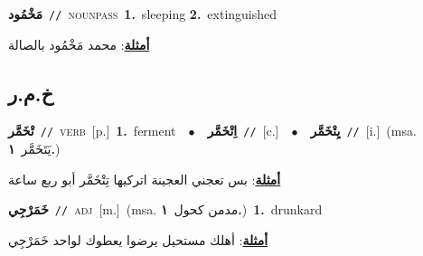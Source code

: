 \documentclass[10pt,a4paper,twoside]{article} %
\begin{document}
\begin{multicols}{2}
{\setlength\topsep{0pt}\textbf{\foreignlanguage{arabic}{مَخْمُود}}\ {\color{gray}\texttt{//}\color{black}}\ \textsc{noun\textunderscore pass}\ \textbf{1.}~sleeping  \textbf{2.}~extinguished\  \begin{flushright}\color{gray}\foreignlanguage{arabic}{\textbf{\underline{\foreignlanguage{arabic}{أمثلة}}}: محمد مَخْمُود بالصالة}\end{flushright}\color{black}} \vspace{2mm}

\vspace{-3mm}
\subsection*{\color{blue}\foreignlanguage{arabic}{خ.م.ر}\color{blue}{}} 

{\setlength\topsep{0pt}\textbf{\foreignlanguage{arabic}{تْخَمَّر}}\ {\color{gray}\texttt{//}\color{black}}\ \textsc{verb}\ [p.]\ \textbf{1.}~ferment\ \ $\bullet$\ \ \setlength\topsep{0pt}\textbf{\foreignlanguage{arabic}{اِتْخَمَّر}}\ {\color{gray}\texttt{//}\color{black}}\ [c.]\ \ $\bullet$\ \ \setlength\topsep{0pt}\textbf{\foreignlanguage{arabic}{يِتْخَمَّر}}\ {\color{gray}\texttt{//}\color{black}}\ [i.]\ \color{gray}(msa. \foreignlanguage{arabic}{يَتَخَمَّر}~\foreignlanguage{arabic}{\textbf{١.}})\color{black}\  \begin{flushright}\color{gray}\foreignlanguage{arabic}{\textbf{\underline{\foreignlanguage{arabic}{أمثلة}}}: بس تعجني العجينة اتركيها تِتْخَمَّر أبو ربع ساعة}\end{flushright}\color{black}} \vspace{2mm}

{\setlength\topsep{0pt}\textbf{\foreignlanguage{arabic}{خَمَرْجِي}}\ {\color{gray}\texttt{//}\color{black}}\ \textsc{adj}\ [m.]\ \color{gray}(msa. \foreignlanguage{arabic}{مدمن كحول}~\foreignlanguage{arabic}{\textbf{١.}})\color{black}\ \textbf{1.}~drunkard\  \begin{flushright}\color{gray}\foreignlanguage{arabic}{\textbf{\underline{\foreignlanguage{arabic}{أمثلة}}}: أهلك مستحيل يرضوا يعطوك لواحد خَمَرْجِي}\end{flushright}\color{black}} \vspace{2mm}


\end{multicols}
\end{document}

